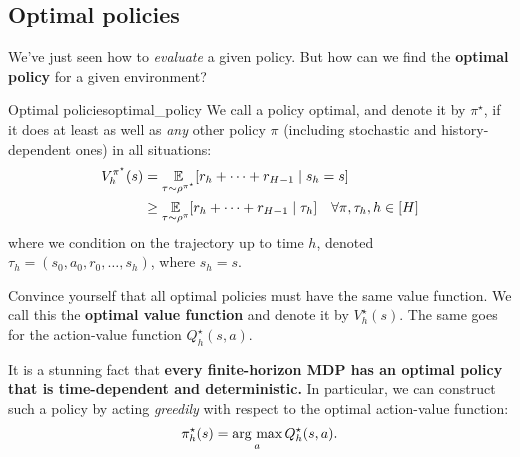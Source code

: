 \documentclass[\main/main]{subfiles}
\begin{document}
\subsection{Optimal policies}

We've just seen how to \emph{evaluate} a given policy. But how can we find the \textbf{optimal policy} for a given environment?

\begin{definition}{Optimal policies}{optimal_policy}
    We call a policy optimal, and denote it by $\pi^\star$, if it does at least as well as \emph{any} other policy $\pi$ (including stochastic and history-dependent ones) in all situations:
    \begin{equation}
        \begin{aligned}
            V_h^{\pi^\star}(s) &= \operatorname*{\mathbb{E}}_{\tau \sim \rho^{\pi^{\star}}}[r_h + \cdots + r_{H-1} \mid s_h = s] \\
            &\ge \operatorname*{\mathbb{E}}_{\tau \sim \rho^{\pi}}[r_h + \cdots + r_{H-1} \mid \tau_h] \quad \forall \pi, \tau_h, h \in [H]
        \end{aligned}
        \label{eq:optimal_policy_finite}
    \end{equation}
    where we condition on the trajectory up to time $h$, denoted $\tau_h = (s_0, a_0, r_0, \dots, s_h)$, where $s_h = s$.
\end{definition}

Convince yourself that all optimal policies must have the same value function. We call this the \textbf{optimal value function} and denote it by $V_h^\star(s)$. The same goes for the action-value function $Q_h^\star(s, a)$.

It is a stunning fact that \textbf{every finite-horizon MDP has an optimal policy that is time-dependent and deterministic.} In particular, we can construct such a policy by acting \emph{greedily} with respect to the optimal action-value function:
\[
    \pi_h^\star(s) = \operatorname*{\textrm{arg\ max}}_a Q_h^\star(s, a).
\]
\end{document}

